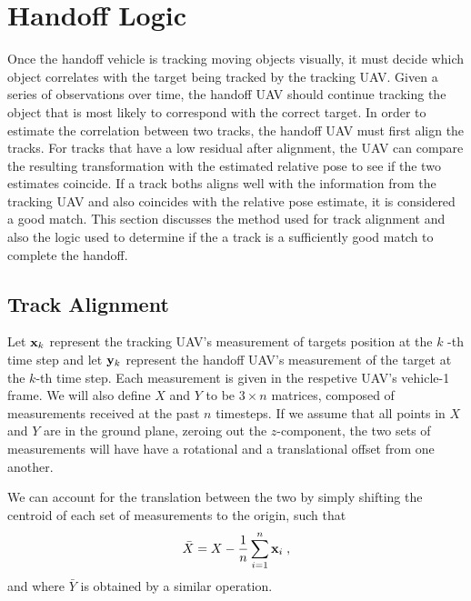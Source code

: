 \chapter{Handoff Logic}
\label{ch:handoff_logic}

Once the handoff vehicle is tracking moving objects visually, it must decide which object correlates with the target being tracked by the tracking UAV.
Given a series of observations over time, the handoff UAV should continue tracking the object that is most likely to correspond with the correct target. In order to estimate the correlation between two tracks, the handoff UAV must first align the tracks. For tracks that have a low residual after alignment, the UAV can compare the resulting transformation with the estimated relative pose to see if the two estimates coincide. If a track boths aligns well with the information from the tracking UAV and also coincides with the relative pose estimate, it is considered a good match. This section discusses the method used for track alignment and also the logic used to determine if the a track is a sufficiently good match to complete the handoff.


\section{Track Alignment}
Let ${\mathbf{x}}_k$ represent the tracking UAV's measurement of targets position at the $k$ -th time step and let ${\mathbf{y}}_{k}$ represent the handoff UAV's measurement of the target at the $k$-th time step. Each measurement is given in the respetive UAV's vehicle-1 frame. We will also define $X$ and $Y$ to be $3 \times n$ matrices, composed of measurements received at the past $n$ timesteps. If we assume that all points in $X$ and $Y$ are in the ground plane, zeroing out the $z$-component, the two sets of measurements will have have a rotational and a translational offset from one another.

We can account for the translation between the two by simply shifting the centroid of each set of measurements to the origin, such that
\begin{equation}
    \bar{X} = X - \frac{1}{n}\sum\limits_{i=1}^{n} {\mathbf{x}}_i\;,
\end{equation}
and where $\bar{Y}$ is obtained by a similar operation.

